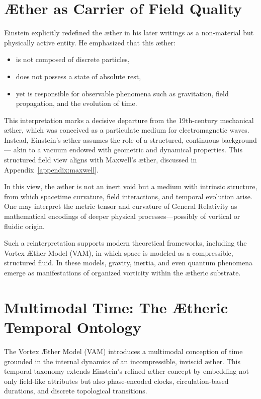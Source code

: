 \documentclass[preprint,notitlepage]{revtex4-2}
\begin{document}
\section{Æther as Carrier of Field Quality}

Einstein explicitly redefined the æther in his later writings as a non-material but physically active entity. He emphasized that this æther:

\begin{itemize}
    \item is not composed of discrete particles,
    \item does not possess a state of absolute rest,
    \item yet is responsible for observable phenomena such as gravitation, field propagation, and the evolution of time.
\end{itemize}

This interpretation marks a decisive departure from the 19th-century mechanical æther, which was conceived as a particulate medium for electromagnetic waves. Instead, Einstein's æther assumes the role of a structured, continuous background — akin to a vacuum endowed with geometric and dynamical properties. This structured field view aligns with Maxwell’s æther, discussed in Appendix~\ref{appendix:maxwell}.

In this view, the æther is not an inert void but a medium with intrinsic structure, from which spacetime curvature, field interactions, and temporal evolution arise. One may interpret the metric tensor and curvature of General Relativity as mathematical encodings of deeper physical processes—possibly of vortical or fluidic origin.

Such a reinterpretation supports modern theoretical frameworks, including the Vortex Æther Model (VAM), in which space is modeled as a compressible, structured fluid. In these models, gravity, inertia, and even quantum phenomena emerge as manifestations of organized vorticity within the ætheric substrate.


\section{Multimodal Time: The Ætheric Temporal Ontology}

The Vortex Æther Model (VAM) introduces a multimodal conception of time grounded in the internal dynamics of an incompressible, inviscid æther. This temporal taxonomy extends Einstein’s refined æther concept by embedding not only field-like attributes but also phase-encoded clocks, circulation-based durations, and discrete topological transitions.
\end{document}
